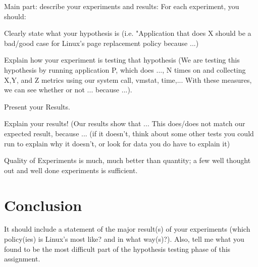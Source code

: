 \documentclass[twocolumn]{article}
\begin{document}
Main part: describe your experiments and results: For each experiment, you should:

Clearly state what your hypothesis is (i.e. "Application that does X should be a bad/good case for Linux's page replacement policy because ...)

Explain how your experiment is testing that hypothesis (We are testing this hypothesis by running application P, which does ..., N times on and collecting X,Y, and Z metrics using our system call, vmstat, time,... With these measures, we can see whether or not ... because ...).

Present your Results.

Explain your results! 
(Our results show that ... This does/does not match our expected result, because ... (if it doesn't, think about some other tests you could run to explain why it doesn't, or look for data you do have to explain it)

Quality of Experiments is much, much better than quantity; a few well thought out and well done experiments is sufficient.

\section{Conclusion}

It should include a statement of the major result(s) of your experiments (which policy(ies) is Linux's most like? and in what way(s)?). Also, tell me what you found to be the most difficult part of the hypothesis testing phase of this assignment.
\end{document}
